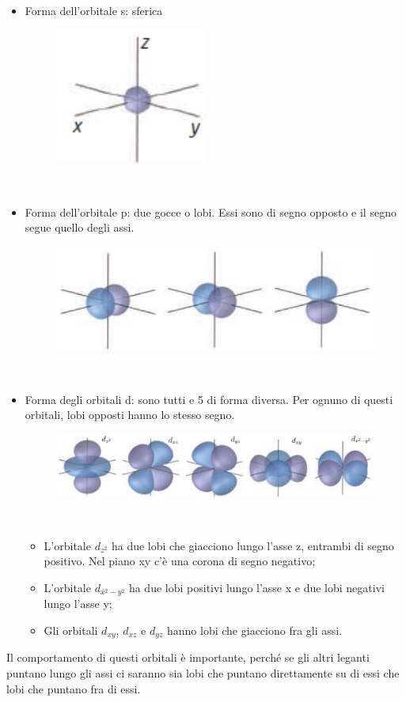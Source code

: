\begin{itemize}
  \item Forma dell'orbitale s: sferica
  \begin{figure}[htp]
    \centering
    \includegraphics[width=5cm]{immagini/orbitale-s.png}
  \end{figure}\\
  \item Forma dell'orbitale p: due gocce o lobi. Essi sono di segno opposto e il segno segue quello degli assi.
  \begin{figure}[htp]
    \centering
    \includegraphics[width=12cm]{immagini/orbitale-p.png}
  \end{figure}\\
  \item Forma degli orbitali d: sono tutti e 5 di forma diversa. Per ognuno di questi orbitali, lobi opposti hanno lo stesso segno.
  \begin{figure}[htp]
    \centering
    \includegraphics[width=15cm]{immagini/orbitale-d.png}
  \end{figure}\\
  \begin{itemize}
    \item L'orbitale $d_{z^2}$ ha due lobi che giacciono lungo l'asse z, entrambi di segno positivo. Nel piano xy c'è una corona di segno negativo;
    \item L'orbitale $d_{x^2-y^2}$ ha due lobi positivi lungo l'asse x e due lobi negativi lungo l'asse y;
    \item Gli orbitali $d_{xy}$, $d_{xz}$ e $d_{yz}$ hanno lobi che giacciono fra gli assi.
  \end{itemize}
\end{itemize}
Il comportamento di questi orbitali è importante, perché se gli altri leganti puntano lungo gli assi ci saranno sia lobi che puntano direttamente su di essi che lobi che puntano fra di essi.

